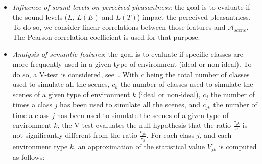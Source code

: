 \documentclass[12pt]{elsarticle}
\begin{document}
\begin{itemize}

\item \emph{Influence of sound levels on perceived pleasantness}: the goal is to evaluate if the sound levels ($L$, $L(E)$ and $L(T)$) impact the perceived pleasantness. To do so, we consider linear correlations between those features and $\mathcal{A}_{scene}$. The Pearson correlation coefficient is used for that purpose.



\item \emph{Analysis of semantic features}: the goal is to evaluate if specific classes are more frequently used in a given type of environment (ideal or non-ideal). To do so, a V-test is considered, see~\citep{rakotomalala2008tvpercent}. With $c$ being the total number of classes used to simulate all the scenes, $c_k$ the number of classes used to simulate the scenes of a given type of environment $k$ (ideal or non-ideal), $c_j$ the number of times a class $j$ has been used to simulate all the scenes, and $c_{jk}$ the number of time a class $j$ has been used to simulate the scenes of a given type of environment $k$, the V-test evaluates the null hypothesis that the ratio $\frac{c_{jk}}{c}$ is not significantly different from the ratio $\frac{c_{jk}}{c_k}$. For each class $j$, and each environment type $k$, an approximation of the statistical value $V_{jk}$ is computed as follows:


\end{itemize}
\end{document}
